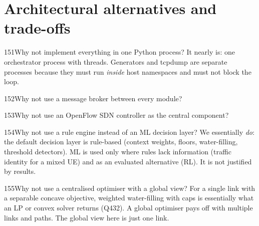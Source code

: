 \section{Architectural alternatives and trade-offs}

\begin{qa}{151}{Why not implement everything in one Python process?}
It nearly is: one orchestrator process with threads. Generators and tcpdump are separate processes because they must
run \emph{inside} host namespaces and must not block the loop.
\end{qa}

\begin{qa}{152}{Why not use a message broker between every module?}
\end{qa}

\begin{qa}{153}{Why not use an OpenFlow SDN controller as the central component?}
\end{qa}

\begin{qa}{154}{Why not use a rule engine instead of an ML decision layer?}
We essentially \emph{do}: the default decision layer is rule-based (context weights, floors, water-filling,
threshold detectors). ML is used only where rules lack information (traffic identity for a mixed UE) and as an
evaluated alternative (RL). It is not justified by results.
\end{qa}

\begin{qa}{155}{Why not use a centralised optimiser with a global view?}
For a single link with a separable concave objective, weighted water-filling with caps is essentially what an LP or
convex solver returns (Q432). A global optimiser pays off with multiple links and paths. The global view here is
just one link.
\end{qa}

